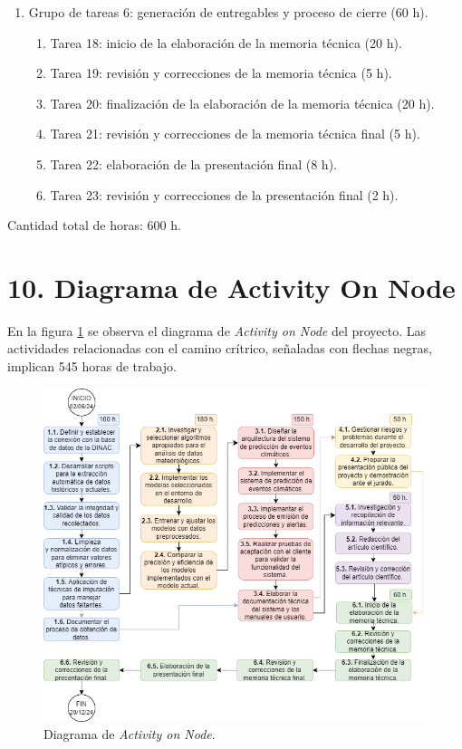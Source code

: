 \documentclass[
11pt, %
codirector, %
]{charter}
\begin{document}
\begin{enumerate}
\begin{enumerate}
	\end{enumerate}		
\item Grupo de tareas 6: generación de entregables y proceso de cierre (60 h).
\begin{enumerate}
	\item Tarea 18: inicio de la elaboración de la memoria técnica (20 h).
	\item Tarea 19: revisión y correcciones de la memoria técnica (5 h).
	\item Tarea 20: finalización de la elaboración de la memoria técnica (20 h).
	\item Tarea 21: revisión y correcciones de la memoria técnica final (5 h).
	\item Tarea 22: elaboración de la presentación final (8 h).
	\item Tarea 23: revisión y correcciones de la presentación final (2 h).
	\end{enumerate}
\end{enumerate}

Cantidad total de horas: 600 h.

\section{10. Diagrama de Activity On Node}
\label{sec:AoN}

En la figura \ref{fig:AoN} se observa el diagrama de \textit{Activity on Node} del proyecto. Las actividades relacionadas con el camino crítrico, señaladas con flechas negras, implican 545 horas de trabajo.

\begin{figure}[htpb]
\centering 
\includegraphics[width=.8\textwidth]{./Figuras/AoN.png}
\caption{Diagrama de \textit{Activity on Node}.}
\label{fig:AoN}
\end{figure}
\end{document}
